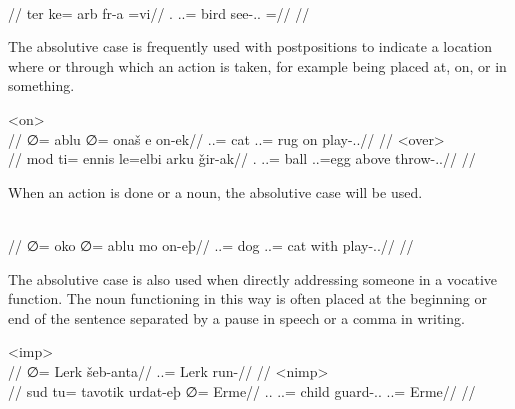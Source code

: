 	\begingl
		\glpreamble{}\\
		//
		\gla ter ke= arb fr-a =vi//
		\glb \Sps.\Abs{} \An.\Sg.\Dat= bird see-\Ind.\Npst.\Ipfv{} =\Int//
		\glft{}//
	\endgl
\xe

The absolutive case is frequently used with postpositions to indicate a location where or through which an action is taken, for example being placed at, on, or in something.

	\a<on>\begingl
		\glpreamble{}\\
		//
		\gla ∅= ablu ∅= onaš e on-ek//
		\glb \An.\Sg.\Abs= cat \In.\Sg.\Abs= rug on play-\Ind.\Pst.\Pfv//
		\glft{}//
	\endgl
	\a<over>\begingl
		\glpreamble{}\\
		//
		\gla mod ti= ennis le=elbi arku ǧir-ak//
		\glb \Fps.\Erg{} \In.\Sg.\Acc= ball \In.\Pc.\Abs=egg above throw-\Ind.\Pst.\Pfv//
		\glft{}//
	\endgl
\xe

When an action is done  or  a noun, the absolutive case will be used.

	\begingl
		\glpreamble{}\\
		//
		\gla ∅= oko ∅= ablu mo on-eþ//
		\glb \An.\Sg.\Abs= dog \An.\Sg.\Abs= cat with play-\Ind.\Npst.\Prg//
		\glft{}//
	\endgl
\xe

The absolutive case is also used when directly addressing someone in a vocative function. The noun functioning in this way is often placed at the beginning or end of the sentence separated by a pause in speech or a comma in writing.

	\a<imp>\begingl
		\glpreamble{}\\
		//
		\gla ∅= Lerk šeb-anta//
		\glb \An.\Sg.\Abs= Lerk run-\Imp//
		\glft{}//
	\endgl
	\a<nimp>\begingl
		\glpreamble{}\\
		//
		\gla sud tu= tavotik urdat-eþ ∅= Erme//
		\glb \Tps.\An.\Erg{} \An.\Sg.\Acc= child guard-\Ind.\Npst.\Prg{} \An.\Sg.\Abs= Erme//
		\glft{}//
	\endgl
\xe

